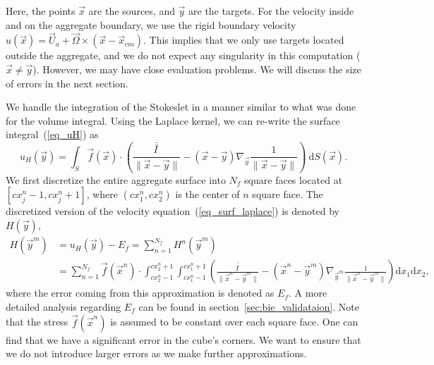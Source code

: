Here, the points $\vec{x}$ are the sources, and $\vec{y}$ are the targets. 
For the velocity inside and on the aggregate boundary, we use the rigid boundary velocity $u(\vec{x}) = \vec{U}_a + \vec{\Omega} \times \left(\vec{x} - \vec{x}_{cm} \right)$. This implies that we only use targets located outside the aggregate, and we do not expect any singularity in this computation ($\vec{x} \neq \vec{y}$). However, we may have close evaluation problems. We will discuss the size of errors in the next section. 
\par
We handle the integration of the Stokeslet in a manner similar to what was done for the volume integral. 
Using the Laplace kernel, we can re-write the surface integral~(\ref{eq_uH}) as
\begin{equation}
	u_H(\vec{y}) =
	\int_S 
	\vec{f}(\vec{x}) \cdot
  	\left(
  	\frac{\bar{\bar{I \ }}}{\|\vec{x} - \vec{y}\|}
  	- \left( \vec{x} - \vec{y} \right)
  	 \nabla_{\vec{y}}
  	\frac{1}{\|\vec{x} - \vec{y}\|}
  	\right)
	  \ \text{d} S(\vec{x}).
 \label{eq_surf_laplace}
\end{equation}
We first discretize the entire aggregate surface into $N_f$ square faces located at $[cx_j^n-1, cx^n_j+1]$, where $(cx^n_1, cx^n_2)$ is the center of $n$ square face. The discretized version of the velocity equation~(\ref{eq_surf_laplace}) is denoted by $H(\vec{y})$,
\begin{align}
	H(\vec{y}^m) & = u_H(\vec{y}) - E_f
	 = \sum_{n = 1}^{N_f} H^n(\vec{y}^m) 
	\nonumber \\
	& = \sum_{n = 1}^{N_f} 
	\vec{f}(\vec{x}^n) \cdot
	\int_{cx^n_2-1}^{cx^n_2+1} \int_{cx_1^n-1}^{cx_1^n+1}
  	\left(
  	\frac{\bar{\bar{I \ }}}{\|\vec{x}^n - \vec{y}^m\|}
  	- \left( \vec{x}^n - \vec{y}^m \right)
  	 \nabla_{\vec{y}^m}
  	\frac{1}{\|\vec{x}^n - \vec{y}^m\|}
  	\right)
	  \text{d} x_1  \text{d} x_2
	  ,
 \label{eq_surf_fmm_N_f}
\end{align}
where the error coming from this approximation is denoted as $E_f$. A more detailed analysis regarding $E_f$ can be found in section~\ref{sec:bie_validataion}.
 Note that the stress $\vec{f}(\vec{x}^n)$ is assumed to be constant over each square face.  One can find that we have a significant error in the cube's corners. We want to ensure that we do not introduce larger errors as we make further approximations. 

